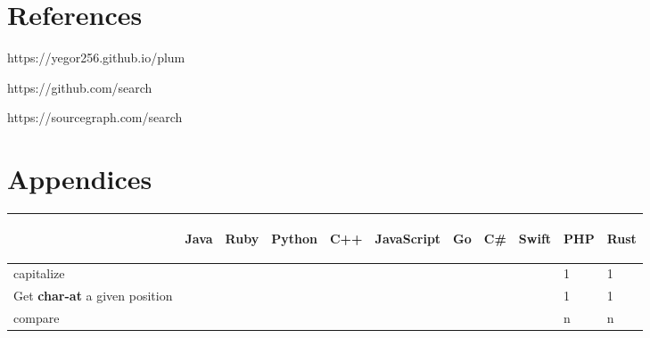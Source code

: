 \documentclass[anonymous,sigplan,review,11pt,nonacm,natbib=false]{acmart}
\begin{document}
    \section{References}

    https://yegor256.github.io/plum

    https://github.com/search

    https://sourcegraph.com/search

    \section{Appendices}

    \begin{table*}
        \begin{tabular}{lllllllllll}
            \hline
            & \begin{sideways}Java\end{sideways}
            & \begin{sideways}Ruby\end{sideways}
            & \begin{sideways}Python\end{sideways}
            & \begin{sideways}C++\end{sideways}
            & \begin{sideways}JavaScript\end{sideways}
            & \begin{sideways}Go\end{sideways}
            & \begin{sideways}C\#\end{sideways}
            & \begin{sideways}Swift\end{sideways}
            & \begin{sideways}PHP\end{sideways}
            & \begin{sideways}Rust\end{sideways}
            \\ \hline

            capitalize &  &  &  &  &  & &  &  & 1 & 1 \\

            Get \textbf{char-at} a given position &  &  &  &  &  & &  &  & 1 & 1 \\

            compare &  &  &  &  &  & &  &  & n & n \\


\end{tabular}
\end{table*}
\end{document}
